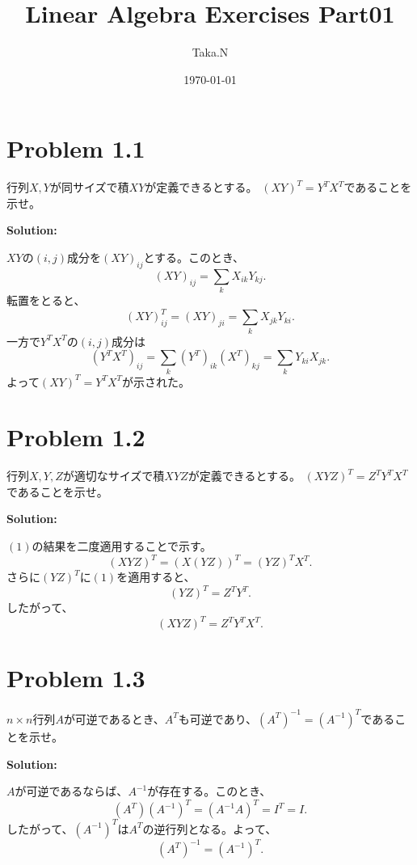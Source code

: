 \documentclass[uplatex,dvipdfmx]{jlreq}		%
\title{Linear Algebra Exercises Part01}
\author{Taka.N}
\date{\today}
\newenvironment{solution}{
  \par\noindent\textbf{Solution:} \itshape
}{\vspace{10pt}}
\begin{document}
\maketitle

\tableofcontents
\newpage %

\section{Problem 1.1}
\begin{problem}[Prob1.1]
行列$X, Y$が同サイズで積$XY$が定義できるとする。  
$(XY)^T = Y^T X^T$であることを示せ。
\end{problem}

\begin{solution}  
$XY$の$(i,j)$成分を$(XY)_{ij}$とする。このとき、  
\[
(XY)_{ij} = \sum_{k} X_{ik} Y_{kj}.
\]  
転置をとると、  
\[
(XY)^T_{ij} = (XY)_{ji} = \sum_k X_{jk} Y_{ki}.
\]
一方で$Y^T X^T$の$(i,j)$成分は  
\[
(Y^T X^T)_{ij} = \sum_k (Y^T)_{ik} (X^T)_{kj} = \sum_k Y_{ki} X_{jk}.
\]
よって$(XY)^T = Y^T X^T$が示された。
\end{solution}

\section{Problem 1.2}
\begin{problem}[Prob1.2]
行列$X, Y, Z$が適切なサイズで積$XYZ$が定義できるとする。  
$(XYZ)^T = Z^T Y^T X^T$であることを示せ。
\end{problem}

\begin{solution}
$(1)$の結果を二度適用することで示す。  
\[
(XYZ)^T = (X(YZ))^T = (YZ)^T X^T.
\]
さらに$(YZ)^T$に$(1)$を適用すると、  
\[
(YZ)^T = Z^T Y^T.
\]
したがって、  
\[
(XYZ)^T = Z^T Y^T X^T.
\]
\end{solution}

\section{Problem 1.3}
\begin{problem}[Prob1.3]
$n \times n$行列$A$が可逆であるとき、$A^T$も可逆であり、$(A^T)^{-1} = (A^{-1})^T$であることを示せ。
\end{problem}

\begin{solution}
$A$が可逆であるならば、$A^{-1}$が存在する。このとき、  
\[
(A^T)(A^{-1})^T = (A^{-1}A)^T = I^T = I.
\]
したがって、$(A^{-1})^T$は$A^T$の逆行列となる。よって、  
\[
(A^T)^{-1} = (A^{-1})^T.
\]
\end{solution}
\end{document}
